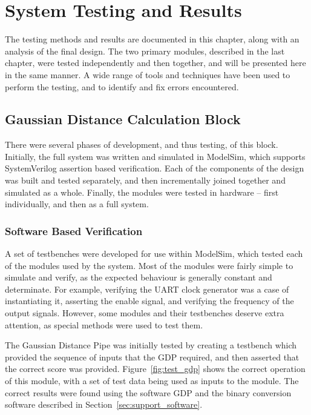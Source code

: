 \chapter{System Testing and Results} %
\label{cha:system_testing}


The testing methods and results are documented in this chapter, along with an analysis of the final design.  The two primary modules, described in the last chapter, were tested independently and then together, and will be presented here in the same manner.  A wide range of tools and techniques have been used to perform the testing, and to identify and fix errors encountered.


\section{Gaussian Distance Calculation Block} %
\label{sec:gaussian_distance_calculation_testing}
	There were several phases of development, and thus testing, of this block.  Initially, the full system was written and simulated in ModelSim, which supports SystemVerilog assertion based verification.  Each of the components of the design was built and tested separately, and then incrementally joined together and simulated as a whole.  Finally, the modules were tested in hardware -- first individually, and then as a full system.

	\subsection{Software Based Verification} %
	\label{sub:software_based_verification}
		A set of testbenches were developed for use within ModelSim, which tested each of the modules used by the system.  Most of the modules were fairly simple to simulate and verify, as the expected behaviour is generally constant and determinate.  For example, verifying the UART clock generator was a case of instantiating it, asserting the enable signal, and verifying the frequency of the output signals.  However, some modules and their testbenches deserve extra attention, as special methods were used to test them.
	
		The Gaussian Distance Pipe was initially tested by creating a testbench which provided the sequence of inputs that the GDP required, and then asserted that the correct score was provided.  Figure~\ref{fig:test_gdp} shows the correct operation of this module, with a set of test data being used as inputs to the module.  The correct results were found using the software GDP and the binary conversion software described in Section~\ref{sec:support_software}.


